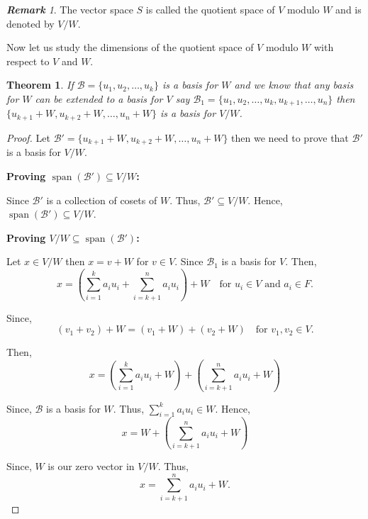 \documentclass[12pt, a4paper]{article}
\newtheorem{theorem}{Theorem}[section]
\theoremstyle{definition}
\theoremstyle{remark}
\newtheorem*{remark}{\textbf{Remark}}
\newcommand{\B}{\mathscr{B}}
\DeclareMathOperator{\Span}{span}
\begin{document}
	\begin{remark}
		The vector space $S$ is called the quotient space of $V$ modulo $W$ and is denoted by $V/W$.
	\end{remark}
	
	Now let us study the dimensions of the quotient space of $V$ modulo $W$ with respect to $V$ and $W$.
	
	\begin{theorem}
		If $\B =\{u_1, u_2, \ldots, u_k\}$ is a basis for $W$ and we know that any basis for $W$ can be extended to a basis for $V$ say $\B_1 = \{u_1, u_2, \ldots, u_k, u_{k+1}, \ldots, u_n\}$ then $\{u_{k+1}+W, u_{k+2}+W, \ldots, u_n+W\}$ is a basis for $V/W$.
	\end{theorem}
	
	\begin{proof}		
		Let $\B' = \{u_{k+1}+W, u_{k+2}+W, \dots, u_n+W\}$ then we need to prove that $\B'$ is a basis for $V/W$.
		
		\vspace{0.3cm}
		
		\noindent \textbf{Proving $\Span(\B') \subseteq V/W$:}
		
		\vspace{0.3cm}
		
		\noindent Since $\B'$ is a collection of cosets of $W$. Thus, $\B' \subseteq V/W$. Hence, $\Span(\B') \subseteq V/W$.
		
		\vspace{0.3cm}
		
		\noindent \textbf{Proving $V/W \subseteq \Span(\B')$:}
		
		\vspace{0.3cm}
		
		\noindent Let $x \in V/W$ then $x = v+W$ for $v \in V$. Since $\B_1$ is a basis for $V$. Then, 
		\[ x = \left(\sum_{i=1}^k a_iu_i + \sum_{i=k+1}^n a_iu_i\right) + W \quad \text{for } u_i \in V \text{ and } a_i \in F. \]
		
		Since, 
		\[ (v_1+v_2)+W = (v_1+W) + (v_2+W) \quad \text{for } v_1, v_2 \in V. \]
		
		Then,
		\[ x = \left(\sum_{i=1}^k a_iu_i + W\right) + \left(\sum_{i=k+1}^n a_iu_i + W\right) \]
		
		Since, $\B$ is a basis for $W$. Thus, $\displaystyle\sum_{i=1}^k a_iu_i \in W$. Hence,
		\[ x = W + \left(\sum_{i=k+1}^n a_iu_i + W\right) \]
		
		Since, $W$ is our zero vector in $V/W$. Thus,
		\[ x = \sum_{i=k+1}^n a_iu_i + W. \]
		

\end{proof}
\end{document}
